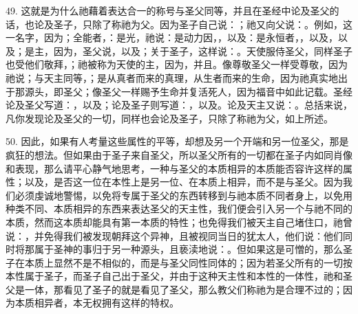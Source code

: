 49. 这就是为什么祂藉着表达合一的称号与圣父同等，并且在圣经中论及圣父的话，也论及圣子，只除了称祂为父。因为圣子自己说：；祂又向父说：。例如，这一名字，因为；全能者，：是光，祂说：是动力因，，以及：是永恒者，，以及，以及；是主，因为，圣父说，以及；关于圣子，这样说：。天使服侍圣父，同样圣子也受他们敬拜，；祂被称为天使的主，因为，并且。像尊敬圣父一样受尊敬，因为祂说；与天主同等，；是从真者而来的真理，从生者而来的生命，因为祂真实地出于那源头，即圣父；像圣父一样赐予生命并复活死人，因为福音中如此记载。圣经论及圣父写道：，以及；论及圣子则写道：，以及。论及天主又说：。总括来说，凡你发现论及圣父的一切，同样也会论及圣子，只除了称祂为父，如上所述。\par

50. 因此，如果有人考量这些属性的平等，却想及另一个开端和另一位圣父，那是疯狂的想法。但如果由于圣子来自圣父，所以圣父所有的一切都在圣子内如同肖像和表现，那么请平心静气地思考，一种与圣父的本质相异的本质能否容许这样的属性；以及，是否这一位在本性上是另一位、在本质上相异，而不是与圣父。因为我们必须虔诚地警惕，以免将专属于圣父的东西转移到与祂本质不同者身上，以免用种类不同、本质相异的东西来表达圣父的天主性，我们便会引入另一个与祂不同的本质，然而这本质却能具有第一本质的特性；也免得我们被天主自己堵住口，祂曾说：，并免得我们被发现朝拜这个异神，且被视同当日的犹太人，他们说：他们同时将那属于圣神的事归于另一种源头，且亵渎地说：。但如果这是可憎的，那么圣子在本质上显然不是不相似的，而是与圣父同性同体的；因为若圣父所有的一切按本性属于圣子，而圣子自己出于圣父，并由于这种天主性和本性的一体性，祂和圣父是一体，那看见了圣子的就是看见了圣父，那么教父们称祂为是合理不过的；因为本质相异者，本无权拥有这样的特权。\par

